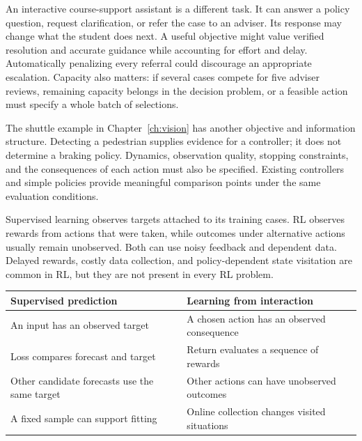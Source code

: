 An interactive course-support assistant is a different task. It can answer a policy question, request clarification, or refer the case to an adviser. Its response may change what the student does next. A useful objective might value verified resolution and accurate guidance while accounting for effort and delay. Automatically penalizing every referral could discourage an appropriate escalation. Capacity also matters: if several cases compete for five adviser reviews, remaining capacity belongs in the decision problem, or a feasible action must specify a whole batch of selections.

The shuttle example in Chapter~\ref{ch:vision} has another objective and information structure. Detecting a pedestrian supplies evidence for a controller; it does not determine a braking policy. Dynamics, observation quality, stopping constraints, and the consequences of each action must also be specified. Existing controllers and simple policies provide meaningful comparison points under the same evaluation conditions.

Supervised learning observes targets attached to its training cases. RL observes rewards from actions that were taken, while outcomes under alternative actions usually remain unobserved. Both can use noisy feedback and dependent data. Delayed rewards, costly data collection, and policy-dependent state visitation are common in RL, but they are not present in every RL problem.

\par\addvspace{\intextsep}\noindent\begin{minipage}{\linewidth}
\centering
\small
\begin{tabular}{@{}L{4.35cm}L{4.65cm}@{}}
\toprule
\textbf{Supervised prediction} & \textbf{Learning from interaction}\\
\midrule
An input has an observed target & A chosen action has an observed consequence\\
Loss compares forecast and target & Return evaluates a sequence of rewards\\
Other candidate forecasts use the same target & Other actions can have unobserved outcomes\\
A fixed sample can support fitting & Online collection changes visited situations\\
\bottomrule
\end{tabular}
\label{tab:rl_vs_sl}
\end{minipage}\par\addvspace{\intextsep}

